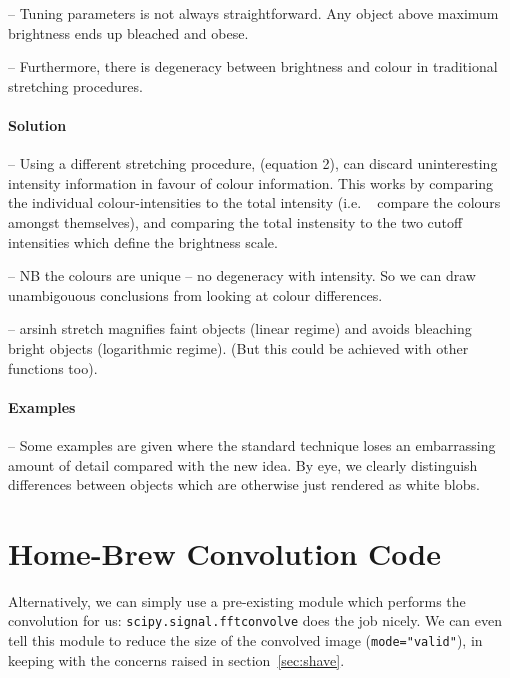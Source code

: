 \documentclass[letterpaper, 11pt]{article}
\def\TODO#1{ {\color{black}{\bf TODO: {#1}}}\xspace}
\begin{document}
-- Tuning parameters is not always straightforward. Any object above maximum brightness ends up bleached and obese.

-- Furthermore, there is degeneracy between brightness and colour in traditional stretching procedures.


\paragraph{Solution}

-- Using a different stretching procedure, (equation 2), can discard uninteresting intensity information in favour of colour information. This works by comparing the individual colour-intensities to the total intensity (i.e. ~ compare the colours amongst themselves), and comparing the total instensity to the two cutoff intensities which define the brightness scale.

-- NB the colours are unique -- no degeneracy with intensity. So we can draw unambigouous conclusions from looking at colour differences.

-- arsinh stretch magnifies faint objects (linear regime) and avoids bleaching bright objects (logarithmic regime). (But this could be achieved with other functions too).


\paragraph{Examples}

-- Some examples are given where the standard technique loses an embarrassing amount of detail compared with the new idea. By eye, we clearly distinguish differences between objects which are otherwise just rendered as white blobs.




\section{Home-Brew Convolution Code}

\TODO{Cato: Needs tidying / deleting}

Alternatively, we can simply use a pre-existing module which performs the convolution for us: \texttt{scipy.signal.fftconvolve} does the job nicely. We can even tell this module to reduce the size of the convolved image (\texttt{mode="valid"}), in keeping with the concerns raised in section~\ref{sec:shave}.
\end{document}
